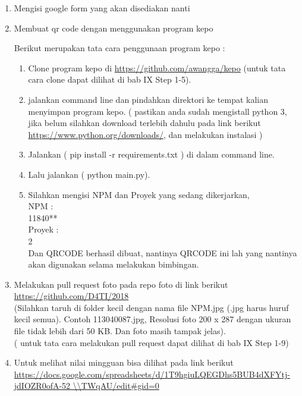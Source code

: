 \begin{enumerate}
 \item Mengisi google form yang akan disediakan nanti
 
 \item Membuat qr code dengan menggunakan program kepo
 \par Berikut merupakan tata cara penggunaan program kepo :
 \begin{enumerate}
 	\item Clone program kepo di \url{https://github.com/awangga/kepo} (untuk tata cara clone dapat dilihat di bab IX Step 1-5).
 	
 	\item jalankan command line dan pindahkan direktori ke tempat kalian menyimpan program kepo. ( pastikan anda sudah mengistall python 3, jika belum silahkan download terlebih dahulu pada link berikut \url{https://www.python.org/downloads/}, dan melakukan instalasi )
 	
 	\item Jalankan ( pip install -r requirements.txt ) di dalam command line.
 	
 	\item Lalu jalankan ( python main.py).
 	\item Silahkan mengisi NPM dan Proyek yang sedang dikerjarkan, \\
 	 		NPM : \\
 	 		11840** \\
 	 		Proyek : \\
 	 		2
 	 		\\ Dan QRCODE berhasil dibuat, nantinya QRCODE ini lah yang nantinya akan digunakan selama melakukan bimbingan.
 \end{enumerate}
 
 \item Melakukan pull request foto pada repo foto di link berikut \url{https://github.com/D4TI/2018} \\
 (Silahkan taruh di folder kecil dengan nama file NPM.jpg (.jpg harus huruf kecil semua). Contoh 113040087.jpg, Resolusi foto 200 x 287 dengan ukuran file tidak lebih dari 50 KB. Dan foto masih tampak jelas).\\
 ( untuk tata cara melakukan pull request dapat dilihat di bab IX Step 1-9)
 
 \item Untuk melihat nilai mingguan bisa dilihat pada link berikut \url{https://docs.google.com/spreadsheets/d/1T9hgiuLQEGDhs5BUB4dXFYtj-jdIOZR0ofA-52 \\TWqAU/edit#gid=0}
 
\end{enumerate}

